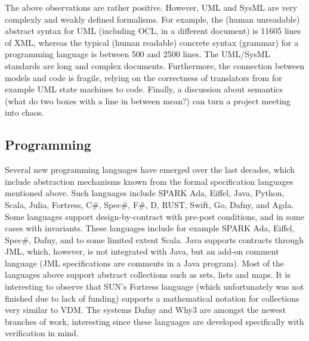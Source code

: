 The above observations are rather positive. However, UML and
SysML are very complexly and weakly defined formalisms. 
For example, the (human unreadable) abstract syntax for UML (including OCL, 
in a different document) is 11605 lines
of XML, whereas the typical (human readable) concrete syntax (grammar) 
for a programming language is between 500 and 2500 lines. 
The UML/SysML standards are long and complex documents. 
Furthermore, the connection between models and code is fragile, relying on the correctness of translators from for example UML state machines to code. Finally, a discussion about semantics
(what do two boxes with a line in between mean?) can turn 
a project meeting into chaos.


\subsection{Programming}

Several new programming languages have emerged over the last 
decades, which include abstraction mechanisms known from the formal 
specification languages mentioned above. Such languages include 
SPARK Ada,
Eiffel, 
Java, 
Python, 
Scala, 
Julia, 
Fortress,  
C\#, 
Spec\#, 
F\#,  
D, 
RUST, 
Swift, 
Go, 
Dafny,
and
Agda.  
Some languages support 
design-by-contract with pre-post conditions, and in some cases with 
invariants. These languages  include for example 
SPARK Ada, Eiffel, Spec\#, Dafny, and to some limited extent Scala. 
Java supports 
contracts through JML, which, however, is not integrated with Java, 
but an add-on comment language (JML specifications are comments in 
a Java program). Most of the languages above support abstract 
collections such as sets, lists and maps. It is interesting to 
observe that SUN’s Fortress language (which unfortunately was not 
finished due to lack of funding) supports a mathematical 
notation for collections very similar to VDM. The systems 
Dafny and Why3 are amongst the newest branches of work, 
interesting since these languages are developed 
specifically with verification in mind.

